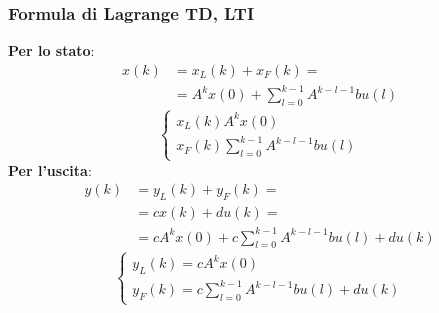 \begin{landscape}
\begin{multicols*}{3}
    \subsubsection*{Formula di Lagrange TD, LTI}
    \textbf{Per lo stato}:
    \[
            \begin{split}
            x(k) &= x_L(k) + x_F(k) =\\
            &=A^k x(0) + \sum_{l=0}^{k-1}A^{k-l-1}bu(l)
            \end{split}
    \]
    \[
        \begin{cases}
            x_L(k) A^k x(0)\\
            x_F(k) \sum_{l=0}^{k-1}A^{k-l-1}bu(l)
        \end{cases}
    \]
    \textbf{Per l'uscita}:
    \[
        \begin{split}
            y(k) &= y_L(k) + y_F(k) =\\
            &= cx(k)+du(k) = \\
            &=cA^k x(0) + c\sum_{l=0}^{k-1}A^{k-l-1}bu(l) + du(k)
        \end{split}
    \]
    \[
        \begin{cases}
            y_L(k) = cA^k x(0)\\
            y_F(k) = c\sum_{l=0}^{k-1}A^{k-l-1}bu(l) + du(k)
        \end{cases}
    \]

\end{multicols*}
\end{landscape}
